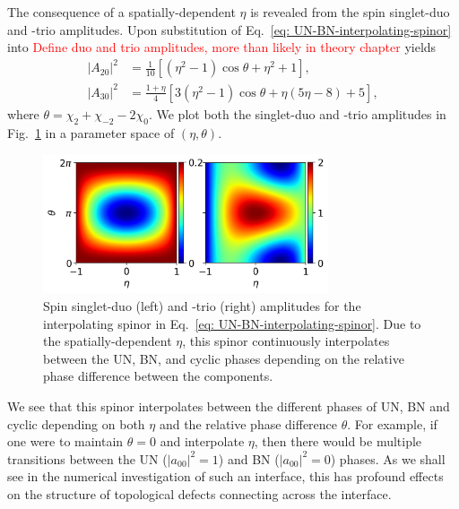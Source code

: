 The consequence of a spatially-dependent \(\eta \) is revealed from the spin
singlet-duo and -trio amplitudes.
Upon substitution of Eq.~\eqref{eq: UN-BN-interpolating-spinor} into
\textcolor{red}{Define duo and trio amplitudes, more than likely in theory
    chapter} yields
\begin{equation}
    \begin{aligned}
        |A_{20}|^2 & = \frac{1}{10} \left[(\eta^2-1)\cos\theta
        + \eta^2 + 1\right],                                          \\
        |A_{30}|^2 & = \frac{1+\eta}{4} \left[3\left(\eta ^2-1\right)
            \cos\theta
            + \eta(5 \eta -8) + 5\right],
    \end{aligned}
\end{equation}
where \(\theta = \chi_2 + \chi_{-2} - 2\chi_0\).
We plot both the singlet-duo and -trio amplitudes in
Fig.~\ref{fig: UN-BN-duo-trio} in a parameter space of \((\eta, \theta)\).
\begin{figure}
    \centering
    \includegraphics[width=0.75\textwidth]{gfx/ch-spin2/a20-a30-varying.png}
    \caption[Spin-singlet duo and trio amplitudes in a parameter space of
        \(\chi \) and \(\eta \)]
    {\label{fig: UN-BN-duo-trio} Spin singlet-duo (left) and -trio
        (right) amplitudes for the interpolating spinor in
        Eq.~\eqref{eq: UN-BN-interpolating-spinor}.
        Due to the spatially-dependent \(\eta \), this spinor continuously
        interpolates between the UN, BN, and cyclic phases depending on the
        relative phase difference between the components.}
\end{figure}
We see that this spinor interpolates between the different phases of UN, BN and
cyclic depending on both \(\eta \) and the relative phase difference
\(\theta \).
For example, if one were to maintain \(\theta=0\) and interpolate \(\eta \),
then there would be multiple transitions between the UN (\(|a_{00}|^2 = 1\)) and
BN (\(|a_{00}|^2 = 0\)) phases.
As we shall see in the numerical investigation of such an interface, this has
profound effects on the structure of topological defects connecting across
the interface.

